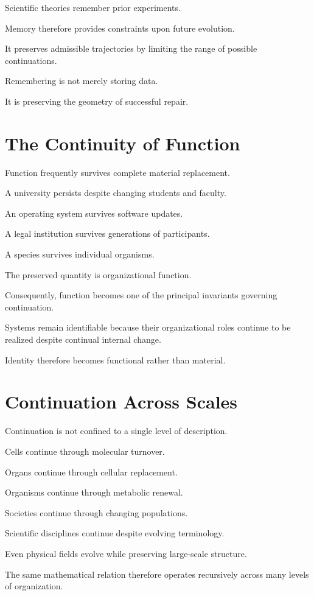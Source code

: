 \documentclass[11pt,oneside]{book}
\numberwithin{equation}{chapter}
\theoremstyle{definition}
\theoremstyle{plain}
\begin{document}
Scientific theories remember prior experiments.

Memory therefore provides constraints upon future evolution.

It preserves admissible trajectories by limiting the range of possible
continuations.

Remembering is not merely storing data.

It is preserving the geometry of successful repair.

\section{The Continuity of Function}

Function frequently survives complete material replacement.

A university persists despite changing students and faculty.

An operating system survives software updates.

A legal institution survives generations of participants.

A species survives individual organisms.

The preserved quantity is organizational function.

Consequently, function becomes one of the principal invariants governing
continuation.

Systems remain identifiable because their organizational roles continue to
be realized despite continual internal change.

Identity therefore becomes functional rather than material.

\section{Continuation Across Scales}

Continuation is not confined to a single level of description.

Cells continue through molecular turnover.

Organs continue through cellular replacement.

Organisms continue through metabolic renewal.

Societies continue through changing populations.

Scientific disciplines continue despite evolving terminology.

Even physical fields evolve while preserving large-scale structure.

The same mathematical relation therefore operates recursively across many
levels of organization.
\end{document}
